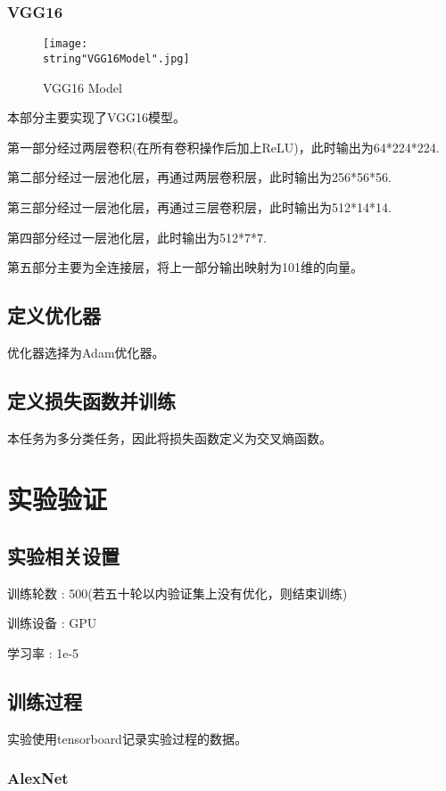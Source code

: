 \documentclass[UTF8]{ctexart}
\begin{document}
\subsubsection{VGG16}
\begin{figure}[H]
    \begin{center}
        \texttt{[image: \\string"VGG16Model".jpg]}
    \caption{VGG16 Model}
    \label{fig:3}
    \end{center}
    \end{figure}
\par
本部分主要实现了VGG16模型。\par 
第一部分经过两层卷积(在所有卷积操作后加上ReLU)，此时输出为64*224*224.\par
第二部分经过一层池化层，再通过两层卷积层，此时输出为256*56*56.\par
第三部分经过一层池化层，再通过三层卷积层，此时输出为512*14*14.\par
第四部分经过一层池化层，此时输出为512*7*7.\par 
第五部分主要为全连接层，将上一部分输出映射为101维的向量。\par

\subsection{定义优化器}
优化器选择为Adam优化器。

\subsection{定义损失函数并训练}
本任务为多分类任务，因此将损失函数定义为交叉熵函数。

\section{实验验证}
\subsection{实验相关设置}
训练轮数 : 500(若五十轮以内验证集上没有优化，则结束训练)\par
训练设备 : GPU\par 
学习率 : 1e-5\par 
\subsection{训练过程}
实验使用tensorboard记录实验过程的数据。\par
\subsubsection{AlexNet}
\end{document}
